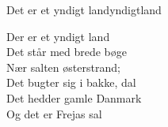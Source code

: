 \begin{song}{Det er et yndigt land}{yndigtland}
\begin{vers}
Der er et yndigt land\\
Det står med brede bøge\\
Nær salten østerstrand;\\
Det bugter sig i bakke, dal\\
Det hedder gamle Danmark\\
Og det er Frejas sal\\
\end{vers}
\end{song}
